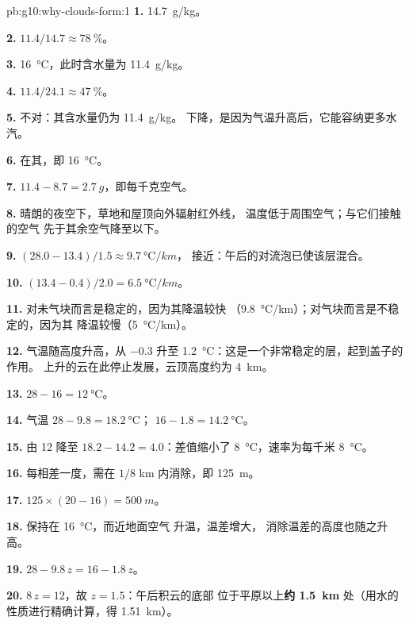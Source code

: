 \begin{solution}{pb:g10:why-clouds-form:1}
\textbf{1.} \qty{14.7}{g/kg}。

\textbf{2.} $11.4/14.7 \approx \qty{78}{\percent}$。

\textbf{3.} \qty{16}{\degreeCelsius}，此时含水量为
\qty{11.4}{g/kg}。

\textbf{4.} $11.4/24.1 \approx \qty{47}{\percent}$。

\textbf{5.} 不对：其含水量仍为 \qty{11.4}{g/kg}。
下降，是因为气温升高后，它能容纳更多水汽。

\textbf{6.} 在其，即 \qty{16}{\degreeCelsius}。

\textbf{7.} $11.4 - 8.7 = \qty{2.7}{g}$，即每千克空气。

\textbf{8.} 晴朗的夜空下，草地和屋顶向外辐射红外线，
温度低于周围空气；与它们接触的空气
先于其余空气降至以下。

\textbf{9.} $(28.0 - 13.4)/1.5 \approx \qty{9.7}{\degreeCelsius/km}$，
接近：午后的对流泡已使该层混合。

\textbf{10.} $(13.4 - 0.4)/2.0 = \qty{6.5}{\degreeCelsius/km}$。

\textbf{11.} 对未气块而言是稳定的，因为其降温较快
（\qty{9.8}{\degreeCelsius/km}）；对气块而言是不稳定的，因为其
降温较慢（\qty{5}{\degreeCelsius/km}）。

\textbf{12.} 气温随高度升高，从 \num{-0.3} 升至
\qty{1.2}{\degreeCelsius}：这是一个非常稳定的层，起到盖子的作用。
上升的云在此停止发展，云顶高度约为 \qty{4}{km}。

\textbf{13.} $28 - 16 = \qty{12}{\degreeCelsius}$。

\textbf{14.} 气温 $28 - 9.8 = \qty{18.2}{\degreeCelsius}$；
$16 - 1.8 = \qty{14.2}{\degreeCelsius}$。

\textbf{15.} 由 12 降至 $18.2 - 14.2 = 4.0$：差值缩小了
\qty{8}{\degreeCelsius}，速率为每千米 \qty{8}{\degreeCelsius}。

\textbf{16.} 每相差一度，需在 $1/8$ km 内消除，即
\qty{125}{m}。

\textbf{17.} $125 \times (20 - 16) = \qty{500}{m}$。

\textbf{18.} 保持在 \qty{16}{\degreeCelsius}，而近地面空气
升温，温差增大，
消除温差的高度也随之升高。

\textbf{19.} $28 - 9.8\,z = 16 - 1.8\,z$。

\textbf{20.} $8\,z = 12$，故 $z = 1.5$：午后积云的底部
位于平原以上\textbf{约 \qty{1.5}{km}} 处（用水的性质进行精确计算，得
\qty{1.51}{km}）。
\end{solution}
